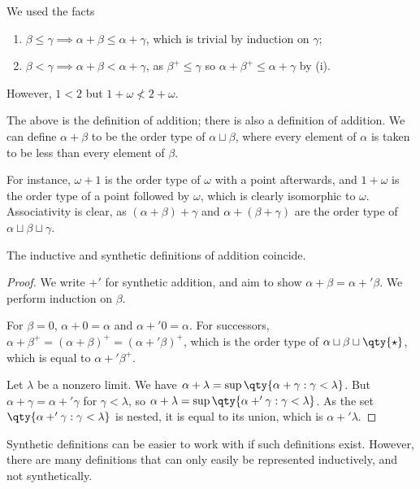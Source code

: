 \begin{remark}
    We used the facts
    \begin{enumerate}
        \item $\beta \leq \gamma \implies \alpha + \beta \leq \alpha + \gamma$, which is trivial by induction on $\gamma$;
        \item $\beta < \gamma \implies \alpha + \beta < \alpha + \gamma$, as $\beta^+ \leq \gamma$ so $\alpha + \beta^+ \leq \alpha + \gamma$ by (i).
    \end{enumerate}
    However, $1 < 2$ but $1 + \omega \not < 2 + \omega$.
\end{remark}
The above is the  definition of addition; there is also a  definition of addition.
We can define $\alpha + \beta$ to be the order type of $\alpha \sqcup \beta$, where every element of $\alpha$ is taken to be less than every element of $\beta$.

For instance, $\omega + 1$ is the order type of $\omega$ with a point afterwards, and $1 + \omega$ is the order type of a point followed by $\omega$, which is clearly isomorphic to $\omega$.
Associativity is clear, as $(\alpha + \beta) + \gamma$ and $\alpha + (\beta + \gamma)$ are the order type of $\alpha \sqcup \beta \sqcup \gamma$.
\begin{proposition}
    The inductive and synthetic definitions of addition coincide.
\end{proposition}
\begin{proof}
    We write $+'$ for synthetic addition, and aim to show $\alpha + \beta = \alpha +' \beta$.
    We perform induction on $\beta$.

    For $\beta = 0$, $\alpha + 0 = \alpha$ and $\alpha +' 0 = \alpha$.
    For successors, $\alpha + \beta^+ = (\alpha + \beta)^+ = (\alpha +' \beta)^+$, which is the order type of $\alpha \sqcup \beta \sqcup \qty{\star}$, which is equal to $\alpha +' \beta^+$.

    Let $\lambda$ be a nonzero limit.
    We have $\alpha + \lambda = \sup\qty{\alpha + \gamma : \gamma < \lambda}$.
    But $\alpha + \gamma = \alpha +' \gamma$ for $\gamma < \lambda$, so $\alpha + \lambda = \sup\qty{\alpha +' \gamma : \gamma < \lambda}$.
    As the set $\qty{\alpha +' \gamma : \gamma < \lambda}$ is nested, it is equal to its union, which is $\alpha +' \lambda$.
\end{proof}
Synthetic definitions can be easier to work with if such definitions exist.
However, there are many definitions that can only easily be represented inductively, and not synthetically.

